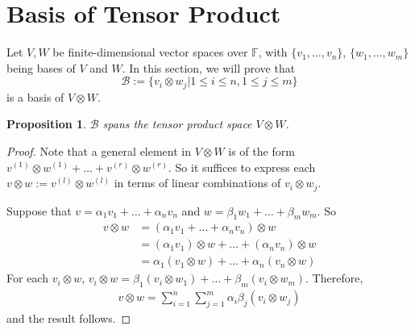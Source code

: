 \documentclass[11pt,openany]{book}
\theoremstyle{plain}
\newtheorem{proposition}[proposition]{Proposition}
\theoremstyle{definition}
\theoremstyle{remark}
\begin{document}
\section{Basis of Tensor Product}
Let $V, W$ be finite-dimensional vector spaces over $\mathbb{F}$, with 
$\{v_1, \dots , v_n\}$, $\{w_1, \dots , w_m\}$ being bases of $V$ and $W$. In this section, we will prove that 
$$\mathcal{B} := \{v_i \otimes w_j | 1 \leq  i \leq  n, 1 \leq  j \leq  m\}$$
is a basis of $V \otimes W$.
\begin{proposition} $\mathcal{B}$ spans the tensor product space $V \otimes W$.
\end{proposition}
\begin{proof}
Note that a general element in $V \otimes W$ is of the form $v^{(1)} \otimes w^{(1)} + \dots + v^{(r)} \otimes w^{(r)}$. So it suffices to express each $v \otimes w := v^{(l)} \otimes w^{(l)}$ in terms of linear combinations of $v_i \otimes w_j$.

Suppose that $v = \alpha_1v_1 + \dots + \alpha_nv_n$ and $w = \beta_1w_1 + \dots + \beta_mw_m$. So
\begin{align*}
v \otimes w &= (\alpha_1v_1 + \dots + \alpha_nv_n) \otimes w \\
&= (\alpha_1v_1) \otimes w + \dots + (\alpha_nv_n) \otimes w \\
&= \alpha_1(v_1 \otimes w) + \dots + \alpha_n(v_n \otimes w) 
\end{align*}
For each $v_i \otimes w$, $v_i \otimes w = \beta_1(v_i \otimes w_1) + \dots + \beta_m(v_i \otimes w_m)$. Therefore,
\begin{align*}
v \otimes w =
\sum_{i=1}^n \sum^m_{j=1} \alpha_i \beta_j (v_i \otimes w_j)
\end{align*}
and the result follows.
\end{proof}
\end{document}
